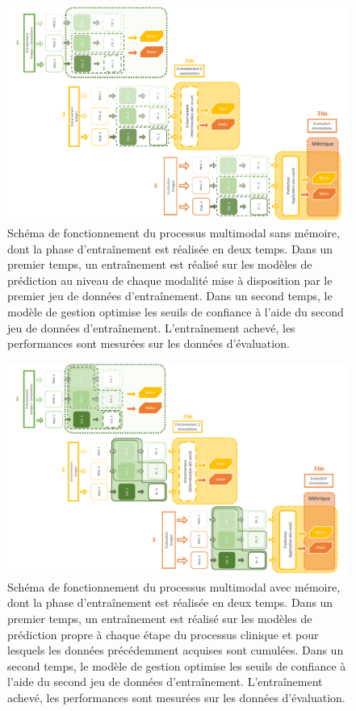 \begin{landscape}
\begin{figure}[H]
    \centering
    \includegraphics[width=0.85\linewidth]{contents/chapter_8/resources/scheme_multimodal_process_without.pdf}
    \caption{Schéma de fonctionnement du processus multimodal sans mémoire, dont la phase d'entraînement est réalisée en deux temps. Dans un premier temps, un entraînement est réalisé sur les modèles de prédiction au niveau de chaque modalité mise à disposition par le premier jeu de données d'entraînement. Dans un second temps, le modèle de gestion optimise les seuils de confiance à l'aide du second jeu de données d'entraînement. L'entraînement achevé, les performances sont mesurées sur les données d'évaluation.}
    \label{fig:scheme_multimodal_process_without}
\end{figure}\par
\end{landscape}

\begin{landscape}
\begin{figure}[H]
    \centering
    \includegraphics[width=0.85\linewidth]{contents/chapter_8/resources/scheme_multimodal_process_with.pdf}
    \caption{Schéma de fonctionnement du processus multimodal avec mémoire, dont la phase d'entraînement est réalisée en deux temps. Dans un premier temps, un entraînement est réalisé sur les modèles de prédiction propre à chaque étape du processus clinique et pour lesquels les données précédemment acquises sont cumulées. Dans un second temps, le modèle de gestion optimise les seuils de confiance à l'aide du second jeu de données d'entraînement. L'entraînement achevé, les performances sont mesurées sur les données d'évaluation.}
    \label{fig:scheme_multimodal_process_with}
\end{figure}\par
\end{landscape}

